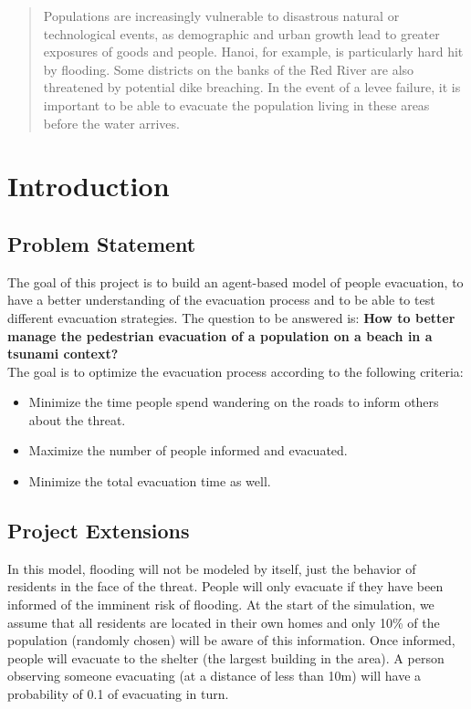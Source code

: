 \documentclass[12pt]{article}
\begin{document}
\maketitlepage

\begin{abstract}
\centering
Populations are increasingly vulnerable to disastrous natural or technological events, as demographic and urban growth lead to greater exposures of goods and people. Hanoi, for example, is particularly hard hit by flooding. Some districts on the banks of the Red River are also threatened by potential dike breaching. In the event of a levee failure, it is important to be able to evacuate the population living in these areas before the water arrives.
\end{abstract}




\section{Introduction}


\subsection{Problem Statement}
The goal of this project is to build an agent-based model of people evacuation, to have a better understanding of the evacuation process and to be able to test different evacuation strategies. The question to be answered is: \textbf{How to better manage the pedestrian evacuation of a population on a beach in a tsunami context?} \\

The goal is to optimize the evacuation process according to the following criteria:
\begin{itemize}
    \item Minimize the time people spend wandering on the roads to inform others about the threat.
    \item Maximize the number of people informed and evacuated.
    \item Minimize the total evacuation time as well.
\end{itemize}


\subsection{Project Extensions}
In this model, flooding will not be modeled by itself, just the behavior of residents in the face of the threat. People will only evacuate if they have been informed of the imminent risk of flooding. At the start of the simulation, we assume that all residents are located in their own homes and only 10\% of the population (randomly chosen) will be aware of this information. Once informed, people will evacuate to the shelter (the largest building in the area). A person observing someone evacuating (at a distance of less than 10m) will have a probability of 0.1 of evacuating in turn.
\end{document}
